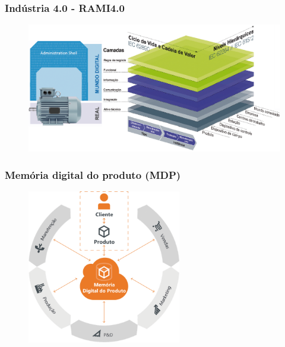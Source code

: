 \documentclass[10pt]{beamer}
\begin{document}
\begin{frame}
	\frametitle{Indústria 4.0 - RAMI4.0}
	
	\begin{figure}[htb]
		\centering
		\label{fig:ass-real-virtual}
		\includegraphics[width=1\textwidth]{ass-real-virtual.png}
	\end{figure}

\end{frame}
\begin{frame}
	\frametitle{Memória digital do produto (MDP)}

	\begin{figure}[htb]
		\centering
		\label{fig:mdp}
		\includegraphics[width=0.6\textwidth]{mdp.png}
	\end{figure}
	 	
\end{frame}
\end{document}
